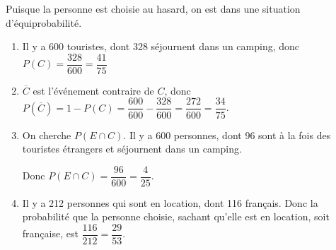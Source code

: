 %
%
%
%
%
Puisque la personne est choisie au hasard, on est dans une situation d'équiprobabilité.
\begin{enumerate}
  \item 
  Il y a 600 touristes, dont 328 séjournent dans un camping, donc \mbox{$P(C)=\dfrac{328}{600}=\dfrac{41}{75}$}
  \item 
  $\overline{C}$ est l’événement contraire de $C$, donc \mbox{$P(\overline{C})=1-P(C)=\dfrac{600}{600}-\dfrac{328}{600}=\dfrac{272}{600}=\dfrac{34}{75}$}.
  \item 
  On cherche \mbox{$P(E\cap C)$}. Il y a 600 personnes, dont 96 sont à la fois des touristes étrangers et séjournent dans un camping.
  
  Donc \mbox{$P(E\cap C)=\dfrac{96}{600}=\dfrac{4}{25}$}.
  \item
   Il y a 212 personnes qui sont en location, dont 116 français. Donc la probabilité que la personne choisie, sachant qu'elle est en location, soit française, est \mbox{$\dfrac{116}{212}=\dfrac{29}{53}$}.
\end{enumerate}


